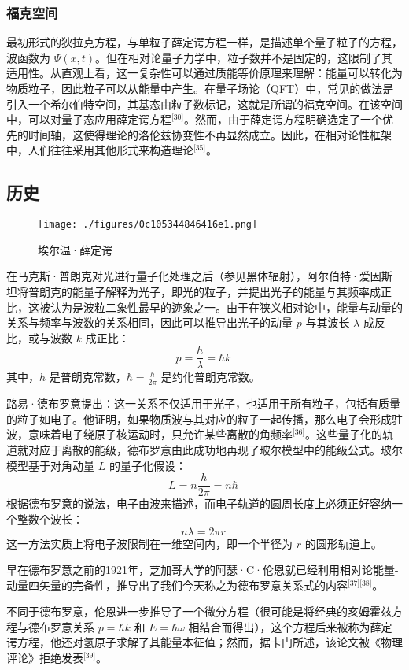 \subsubsection{福克空间}
最初形式的狄拉克方程，与单粒子薛定谔方程一样，是描述单个量子粒子的方程，波函数为 $\Psi(x, t)$。但在相对论量子力学中，粒子数并不是固定的，这限制了其适用性。从直观上看，这一复杂性可以通过质能等价原理来理解：能量可以转化为物质粒子，因此粒子可以从能量中产生。在量子场论（QFT）中，常见的做法是引入一个希尔伯特空间，其基态由粒子数标记，这就是所谓的福克空间。在该空间中，可以对量子态应用薛定谔方程\(^\text{[30]}\)。然而，由于薛定谔方程明确选定了一个优先的时间轴，这使得理论的洛伦兹协变性不再显然成立。因此，在相对论性框架中，人们往往采用其他形式来构造理论\(^\text{[35]}\)。
\subsection{历史}
\begin{figure}[ht]
\centering
\texttt{[image: ./figures/0c105344846416e1.png]}
\caption{埃尔温·薛定谔} \label{fig_XDEfc_6}
\end{figure}
在马克斯·普朗克对光进行量子化处理之后（参见黑体辐射），阿尔伯特·爱因斯坦将普朗克的能量子解释为光子，即光的粒子，并提出光子的能量与其频率成正比，这被认为是波粒二象性最早的迹象之一。由于在狭义相对论中，能量与动量的关系与频率与波数的关系相同，因此可以推导出光子的动量 $p$ 与其波长 $\lambda$ 成反比，或与波数 $k$ 成正比：
$$
p = \frac{h}{\lambda} = \hbar k~
$$
其中，$h$ 是普朗克常数，$\hbar = \frac{h}{2\pi}$ 是约化普朗克常数。

路易·德布罗意提出：这一关系不仅适用于光子，也适用于所有粒子，包括有质量的粒子如电子。他证明，如果物质波与其对应的粒子一起传播，那么电子会形成驻波，意味着电子绕原子核运动时，只允许某些离散的角频率\(^\text{[36]}\)。这些量子化的轨道就对应于离散的能级，德布罗意由此成功地再现了玻尔模型中的能级公式。玻尔模型基于对角动量 $L$ 的量子化假设：
$$
L = n \frac{h}{2\pi} = n\hbar~
$$
根据德布罗意的说法，电子由波来描述，而电子轨道的圆周长度上必须正好容纳一个整数个波长：
$$
n\lambda = 2\pi r~
$$
这一方法实质上将电子波限制在一维空间内，即一个半径为 $r$ 的圆形轨道上。

早在德布罗意之前的1921年，芝加哥大学的阿瑟·C·伦恩就已经利用相对论能量-动量四矢量的完备性，推导出了我们今天称之为德布罗意关系式的内容\(^\text{[37][38]}\)。

不同于德布罗意，伦恩进一步推导了一个微分方程（很可能是将经典的亥姆霍兹方程与德布罗意关系
$p = \hbar k$ 和 $E = \hbar \omega$ 相结合而得出），这个方程后来被称为薛定谔方程，他还对氢原子求解了其能量本征值；然而，据卡门所述，该论文被《物理评论》拒绝发表\(^\text{[39]}\)。

